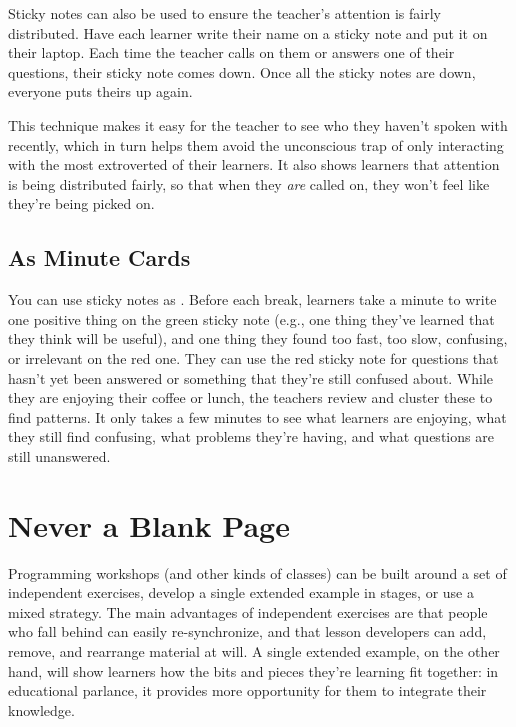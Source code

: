 Sticky notes can also be used to ensure the teacher's attention is
fairly distributed. Have each learner write their name on a sticky
note and put it on their laptop. Each time the teacher calls on them
or answers one of their questions, their sticky note comes down. Once
all the sticky notes are down, everyone puts theirs up again.

This technique makes it easy for the teacher to see who they haven't
spoken with recently, which in turn helps them avoid the unconscious
trap of only interacting with the most extroverted of their learners.
It also shows learners that attention is being distributed fairly, so
that when they \emph{are} called on, they won't feel like they're
being picked on.

\subsection{As Minute Cards}\label{s:classroom-minute-cards}

You can use sticky notes as .
Before each break, learners take a minute to write one positive thing
on the green sticky note (e.g., one thing they've learned that they
think will be useful), and one thing they found too fast, too slow,
confusing, or irrelevant on the red one. They can use the red sticky
note for questions that hasn't yet been answered or something that
they're still confused about.  While they are enjoying their coffee or
lunch, the teachers review and cluster these to find patterns. It only
takes a few minutes to see what learners are enjoying, what they still
find confusing, what problems they're having, and what questions are
still unanswered.

\section{Never a Blank Page}\label{s:classroom-blank}

Programming workshops (and other kinds of classes) can be built around
a set of independent exercises, develop a single extended example in
stages, or use a mixed strategy. The main advantages of independent
exercises are that people who fall behind can easily re-synchronize,
and that lesson developers can add, remove, and rearrange material at
will.  A single extended example, on the other hand, will show
learners how the bits and pieces they're learning fit together: in
educational parlance, it provides more opportunity for them to
integrate their knowledge.

